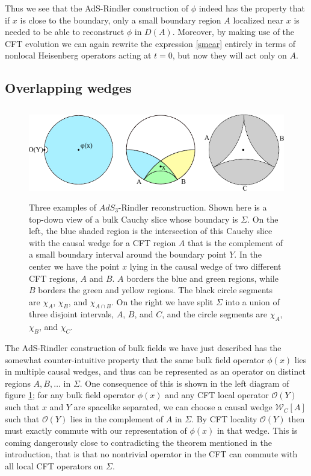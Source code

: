 \documentclass[12pt]{article}
\newcommand{\mO}{\mathcal{O}}
\newcommand{\W}{\mathcal{W}}
\begin{document}
Thus we see that the AdS-Rindler construction of $\phi$ indeed has the property that if $x$ is close to the boundary, only a small boundary region $A$ localized near $x$ is needed to be able to reconstruct $\phi$ in $D(A)$.  Moreover, by making use of the CFT evolution we can again rewrite the expression \eqref{smear} entirely in terms of nonlocal Heisenberg operators acting at $t=0$, but now they will act only on $A$.  

\subsection{Overlapping wedges}
\begin{figure}
\begin{center}
\includegraphics[height=4cm]{paradox1.pdf}
\caption{Three examples of $AdS_3$-Rindler reconstruction.  Shown here is a top-down view of a bulk Cauchy slice whose boundary is $\Sigma$.  On the left, the blue shaded region is the intersection of this Cauchy slice with the causal wedge for a CFT region $A$ that is the complement of a small boundary interval around the boundary point $Y$.  In the center we have the point $x$ lying in the causal wedge of two different CFT regions, $A$ and $B$.  $A$ borders the blue and green regions, while $B$ borders the green and yellow regions. The black circle segments are $\chi_A$, $\chi_B$, and $\chi_{A\cap B}$.  On the right we have split $\Sigma$ into a union of three disjoint intervals, $A$, $B$, and $C$, and the circle segments are $\chi_A$, $\chi_B$, and $\chi_C$.}\label{paradox1fig}
\end{center}
\end{figure}
The AdS-Rindler construction of bulk fields we have just described has the somewhat counter-intuitive property that the same bulk field operator $\phi(x)$ lies in multiple causal wedges, and thus can be represented as an operator on distinct regions $A,B,\ldots$ in $\Sigma$.  One consequence of this is shown in the left diagram of figure \ref{paradox1fig}; for any bulk field operator $\phi(x)$ and any CFT local operator $\mO(Y)$ such that $x$ and $Y$ are spacelike separated, we can choose a causal wedge $\W_C[A]$ such that $\mO(Y)$ lies in the complement of $A$ in $\Sigma$.  By CFT locality $\mO(Y)$ then must exactly commute with our representation of $\phi(x)$ in that wedge.  This is coming dangerously close to contradicting the theorem mentioned in the introduction, that is that no nontrivial operator in the CFT can commute with all local CFT operators on $\Sigma$.  
\end{document}
